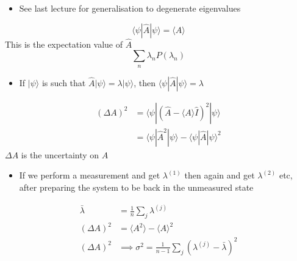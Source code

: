\documentclass[a4paper,11pt,normalem]{article}
\begin{document}
\begin{example}
\begin{itemize}
\item
  See last lecture for generalisation to degenerate eigenvalues
\end{itemize}
\[
    \langle\psi|\hat{A}|\psi\rangle = \langle A\rangle
\]
This is the expectation value of \(\hat{A}\)
\[
    \sum_n \lambda_n P(\lambda_n)
\]
\begin{itemize}
\item
  If \(|\psi\rangle\) is such that
  \(\hat{A}|\psi\rangle = \lambda|\psi\rangle\), then
  \(\langle\psi|\hat{A}|\psi\rangle = \lambda\)
\end{itemize}
\[
    \begin{aligned}
    (\Delta A)^2 &= \langle\psi|(\hat{A} - \langle A\rangle\hat{I})^2|\psi\rangle \\
    &= \langle\psi|\hat{A}^2|\psi\rangle - \langle\psi|\hat{A}|\psi\rangle^2
    \end{aligned}
\]
\(\Delta A\) is the uncertainty on \(A\)
\begin{itemize}
\item
  If we perform a measurement and get \(\lambda^{(1)}\) then again and
  get \(\lambda^{(2)}\) etc, after preparing the system to be back in
  the unmeasured state
\end{itemize}
\[
    \begin{aligned}
    \bar{\lambda} &= \frac{1}{n} \sum_j \lambda^{(j)} \\
    (\Delta A)^2 &= \langle A^2\rangle - \langle A\rangle^2 \\
    (\Delta A)^2 &\implies \sigma^2 = \frac{1}{n-1} \sum_j (\lambda^{(j)} - \bar{\lambda})^2
    \end{aligned}
\]
\end{example}

\section{}\label{lecture-10}
\end{document}
